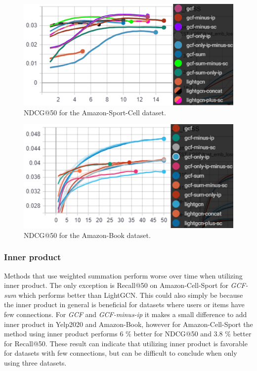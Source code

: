 \begin{figure}[]
    \includegraphics[width=\linewidth]{figures/amazon-cell-sport-gcf-all-ndcg.png}
    \caption{NDCG@50 for the Amazon-Sport-Cell dataset.}
    \label{fig:GCF-NDCG-ablation-study-amazon-cell-sport}
\end{figure}
\begin{figure}[]
    \includegraphics[width=\linewidth]{figures/amazon-book-gcf-all-ndcg.png}
    \caption{NDCG@50 for the Amazon-Book dataset.}
    \label{fig:GCF-NDCG-ablation-study-amazon-book}
\end{figure}

\subsubsection{Inner product}
Methods that use weighted summation perform worse over time when utilizing inner product.
The only exception is Recall@50 on Amazon-Cell-Sport for \textit{GCF-sum} which performs better than LightGCN.
This could also simply be because the inner product in general is beneficial for datasets where users or items have few connections.
For \textit{GCF} and \textit{GCF-minus-ip} it makes a small difference to add inner product in Yelp2020 and Amazon-Book, however for Amazon-Cell-Sport the method using inner product performs 6 \% better for NDCG@50 and 3.8 \% better for Recall@50.
These result can indicate that utilizing inner product is favorable for datasets with few connections, but can be difficult to conclude when only using three datasets.

